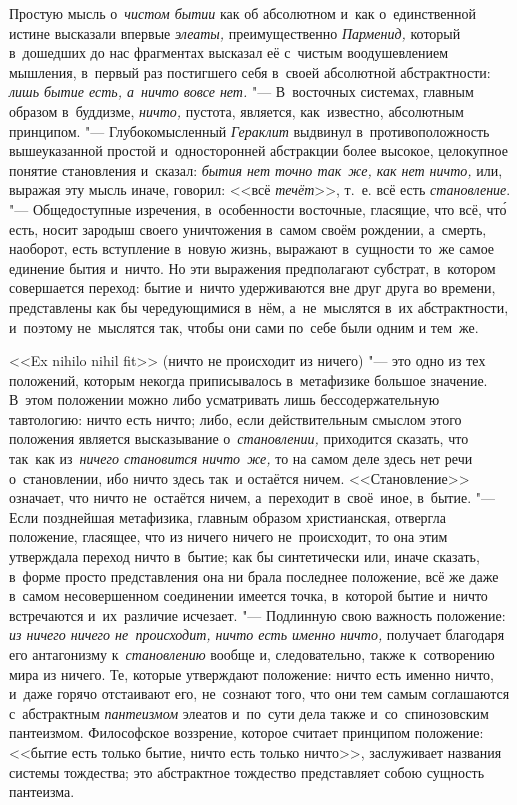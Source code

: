 Простую мысль о~{\em чистом бытии} как об абсолютном и~как о~единственной
истине высказали впервые {\em элеаты,} преимущественно {\em Парменид,} который
в~дошедших до нас фрагментах высказал её с~чистым воодушевлением мышления,
в~первый раз постигшего себя в~своей абсолютной абстрактности:
{\em лишь бытие есть, а~ничто вовсе нет.} "--- В~восточных системах, главным
образом в~буддизме, {\em ничто,} пустота, является, как~известно, абсолютным
принципом. "--- Глубокомысленный {\em Гераклит} выдвинул в~противоположность
вышеуказанной простой и~односторонней абстракции более высокое, целокупное
понятие становления и~сказал: {\em бытия нет точно так~же, как нет ничто,} или,
выражая эту мысль иначе, говорил: <<всё {\em течёт}>>, т.~е. всё есть
{\em становление}. "--- Общедоступные изречения, в~особенности восточные,
гласящие, что всё, чт\'{о} есть, носит зародыш своего уничтожения в~самом своём
рождении, а~смерть, наоборот, есть вступление в~новую жизнь, выражают
в~сущности то~же самое единение бытия и~ничто. Но эти выражения предполагают
субстрат, в~котором совершается переход: бытие и~ничто удерживаются вне друг
друга во времени, представлены как бы чередующимися в~нём, а~не~мыслятся в~их
абстрактности, и~поэтому не~мыслятся так, чтобы они сами по~себе были одним и
тем~же.

<<Ex nihilo nihil fit>> (ничто не происходит из ничего) "--- это одно из тех
положений, которым некогда приписывалось в~метафизике большое значение. В~этом
положении можно либо усматривать лишь бессодержательную тавтологию: ничто есть
ничто; либо, если действительным смыслом этого положения является высказывание
о~{\em становлении,} приходится сказать, что так~как из~{\em ничего становится
ничто~же,} то на самом деле здесь нет речи о~становлении, ибо ничто здесь так~и
остаётся ничем. <<Становление>> означает, что ничто не~остаётся ничем,
а~переходит в~своё~иное, в~бытие. "--- Если позднейшая метафизика, главным
образом христианская, отвергла положение, гласящее, что из ничего ничего
не~происходит, то она этим утверждала переход ничто в~бытие; как бы
синтетически или, иначе сказать, в~форме просто представления она ни брала
последнее положение, всё же даже в~самом несовершенном соединении имеется
точка, в~которой бытие и~ничто встречаются и~их~различие исчезает. "---
Подлинную свою важность положение: {\em из ничего ничего не~происходит, ничто
есть именно ничто,} получает благодаря его антагонизму к~{\em становлению}
вообще и, следовательно, также к~сотворению мира из ничего. Те, которые
утверждают положение: ничто есть именно ничто, и~даже горячо отстаивают его,
не~сознают того, что они тем самым соглашаются с~абстрактным {\em пантеизмом}
элеатов и~по~сути дела также и~со~спинозовским пантеизмом. Философское
воззрение, которое считает принципом положение: <<бытие есть только бытие,
ничто есть только ничто>>, заслуживает названия системы тождества; это
абстрактное тождество представляет собою сущность пантеизма.

